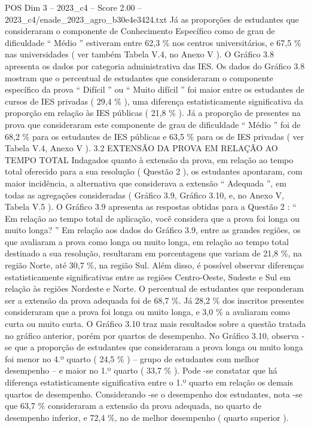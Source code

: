 \begin{textsample}{POS Dim 3 – 2023\_c4 – Score 2.00 – 2023\_c4/enade\_2023\_agro\_b30e4e3424.txt}
Já as proporções de estudantes que consideraram o componente de Conhecimento Específico como de grau de dificuldade “ Médio ” estiveram entre 62,3 \% nos centros universitários, e 67,5 \% nas universidades ( ver também Tabela V.4, no Anexo V ).
O Gráfico 3.8 apresenta os dados por categoria administrativa das IES.
Os dados do Gráfico 3.8 mostram que o percentual de estudantes que consideraram o componente específico da prova “ Difícil ” ou “ Muito difícil ” foi maior entre os estudantes de cursos de IES privadas ( 29,4 \% ), uma diferença estatisticamente significativa da proporção em relação às IES públicas ( 21,8 \% ).
Já a proporção de presentes na prova que consideraram este componente de grau de dificuldade “ Médio ” foi de 68,2 \% para os estudantes de IES públicas e 63,5 \% para os de IES privadas ( ver Tabela V.4, Anexo V ). 3.2 EXTENSÃO DA PROVA EM RELAÇÃO AO TEMPO TOTAL Indagados quanto à extensão da prova, em relação ao tempo total oferecido para a sua resolução ( Questão 2 ), os estudantes apontaram, com maior incidência, a alternativa que considerava a extensão “ Adequada ”, em todas as agregações consideradas ( Gráfico 3.9, Gráfico 3.10, e, no Anexo V, Tabela V.5 ).
O Gráfico 3.9 apresenta as respostas obtidas para a Questão 2 : “ Em relação ao tempo total de aplicação, você considera que a prova foi longa ou muito longa? ” Em relação aos dados do Gráfico 3.9, entre as grandes regiões, os que avaliaram a prova como longa ou muito longa, em relação ao tempo total destinado a sua resolução, resultaram em porcentagens que variam de 21,8 \%, na região Norte, até 30,7 \%, na região Sul.
Além disso, é possível observar diferenças estatisticamente significativas entre as regiões Centro-Oeste, Sudeste e Sul em relação às regiões Nordeste e Norte.
O percentual de estudantes que responderam ser a extensão da prova adequada foi de 68,7 \%.
Já 28,2 \% dos inscritos presentes consideraram que a prova foi longa ou muito longa, e 3,0 \% a avaliaram como curta ou muito curta.
O Gráfico 3.10 traz mais resultados sobre a questão tratada no gráfico anterior, porém por quartos de desempenho.
No Gráfico 3.10, observa -se que a proporção de estudantes que consideraram a prova longa ou muito longa foi menor no 4.º quarto ( 24,5 \% ) – grupo de estudantes com melhor desempenho – e maior no 1.º quarto ( 33,7 \% ).
Pode -se constatar que há diferença estatisticamente significativa entre o 1.º quarto em relação os demais quartos de desempenho.
Considerando -se o desempenho dos estudantes, nota -se que 63,7 \% consideraram a extensão da prova adequada, no quarto de desempenho inferior, e 72,4 \%, no de melhor desempenho ( quarto superior ).

\end{textsample}
